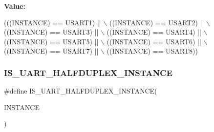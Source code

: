 {\bfseries Value\+:}
\begin{DoxyCode}
(((INSTANCE) == USART1) || \(\backslash\)
                                                 ((INSTANCE) == USART2) || \(\backslash\)
                                                 ((INSTANCE) == USART3) || \(\backslash\)
                                                 ((INSTANCE) == USART4) || \(\backslash\)
                                                 ((INSTANCE) == USART5) || \(\backslash\)
                                                 ((INSTANCE) == USART6) || \(\backslash\)
                                                 ((INSTANCE) == USART7) || \(\backslash\)
                                                 ((INSTANCE) == USART8))
\end{DoxyCode}
\mbox{\label{group___exported__macro_ga69c4aa0c561c4c39c621710fbbb0cb7b}} 
\subsubsection{\texorpdfstring{I\+S\+\_\+\+U\+A\+R\+T\+\_\+\+H\+A\+L\+F\+D\+U\+P\+L\+E\+X\+\_\+\+I\+N\+S\+T\+A\+N\+CE}{IS\_UART\_HALFDUPLEX\_INSTANCE}\hspace{0.1cm}{\footnotesize\ttfamily [13/13]}}
{\footnotesize\ttfamily \#define I\+S\+\_\+\+U\+A\+R\+T\+\_\+\+H\+A\+L\+F\+D\+U\+P\+L\+E\+X\+\_\+\+I\+N\+S\+T\+A\+N\+CE(\begin{DoxyParamCaption}\item[{}]{I\+N\+S\+T\+A\+N\+CE }\end{DoxyParamCaption})}

